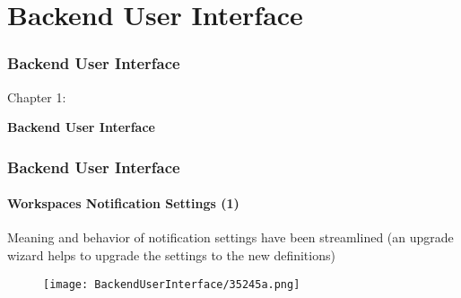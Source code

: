 %

\section{Backend User Interface}
\begin{frame}[fragile]
	\frametitle{Backend User Interface}

	\begin{center}\huge{Chapter 1:}\end{center}
	\begin{center}\huge{\color{typo3darkgrey}\textbf{Backend User Interface}}\end{center}

\end{frame}

\begin{frame}[fragile]
	\frametitle{Backend User Interface}
	\framesubtitle{Workspaces Notification Settings (1)}

	Meaning and behavior of notification settings have been streamlined\newline
	\smaller(an upgrade wizard helps to upgrade the settings to the new definitions)\normalsize

	\begin{figure}
		\texttt{[image: BackendUserInterface/35245a.png]}
	\end{figure}

\end{frame}

